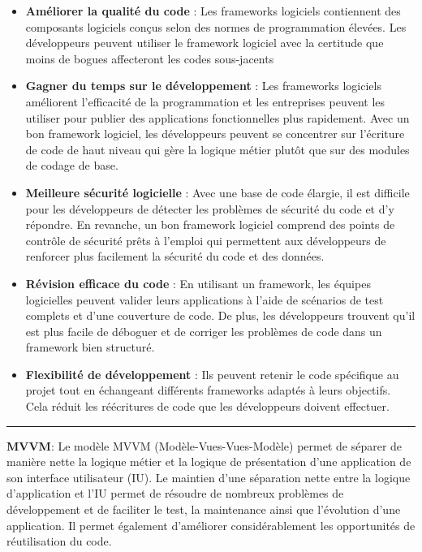\begin{itemize}
	\item \textbf{Améliorer la qualité du code} : Les frameworks logiciels contiennent des composants logiciels conçus selon des normes de programmation élevées. Les développeurs peuvent utiliser le framework logiciel avec la certitude que moins de bogues affecteront les codes sous-jacents
	\item \textbf{Gagner du temps sur le développement} : Les frameworks logiciels améliorent l'efficacité de la programmation et les entreprises peuvent les utiliser pour publier des applications fonctionnelles plus rapidement. Avec un bon framework logiciel, les développeurs peuvent se concentrer sur l'écriture de code de haut niveau qui gère la logique métier plutôt que sur des modules de codage de base.
	\item \textbf{Meilleure sécurité logicielle} : Avec une base de code élargie, il est difficile pour les développeurs de détecter les problèmes de sécurité du code et d'y répondre. En revanche, un bon framework logiciel comprend des points de contrôle de sécurité prêts à l'emploi qui permettent aux développeurs de renforcer plus facilement la sécurité du code et des données.
	\item \textbf{Révision efficace du code} : En utilisant un framework, les équipes logicielles peuvent valider leurs applications à l'aide de scénarios de test complets et d'une couverture de code. De plus, les développeurs trouvent qu'il est plus facile de déboguer et de corriger les problèmes de code dans un framework bien structuré.
	\newpage
	\item \textbf{Flexibilité de développement} : Ils peuvent retenir le code spécifique au projet tout en échangeant différents frameworks adaptés à leurs objectifs. Cela réduit les réécritures de code que les développeurs doivent effectuer.
\end{itemize}

\begin{center}
\rule{5cm}{0.4pt}
\end{center}

\vspace{0.5cm}

\noindent \textbf{MVVM}:
\noindent Le modèle MVVM (Modèle-Vues-Vues-Modèle) permet de séparer de manière nette la logique métier et la logique de présentation d’une application de son interface utilisateur (IU). Le maintien d’une séparation nette entre la logique d’application et l’IU permet de résoudre de nombreux problèmes de développement et de faciliter le test, la maintenance ainsi que l’évolution d’une application. Il permet également d’améliorer considérablement les opportunités de réutilisation du code.

